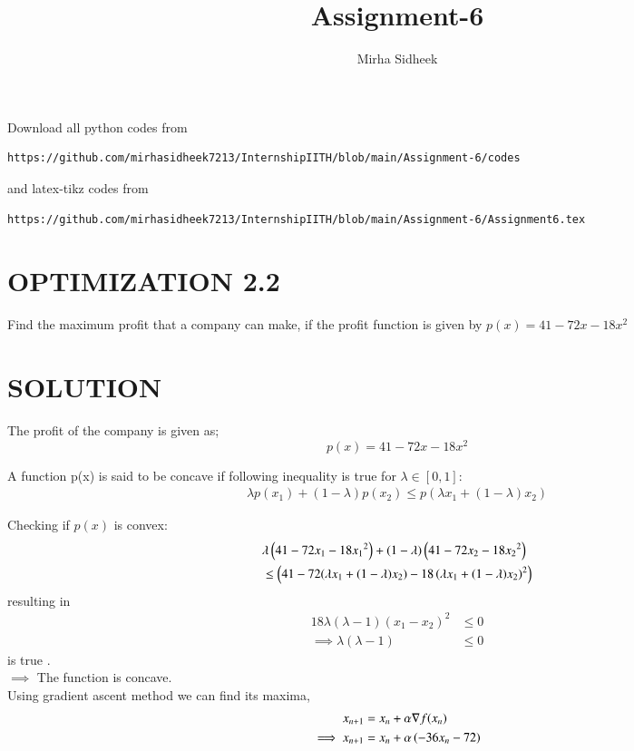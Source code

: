\documentclass[journal,12pt,twocolumn]{IEEEtran}
\begin{document}
     \def\rightbox#1{\makebox[0in][r]{#1}}
     \def\centbox#1{\makebox[0in]{#1}}
     \def\topbox#1{\raisebox{-\baselineskip}[0in][0in]{#1}}
     \def\midbox#1{\raisebox{-0.5\baselineskip}[0in][0in]{#1}}
\vspace{3cm}
\title{Assignment-6}
\author{Mirha Sidheek}
\maketitle
\newpage
\bigskip
\renewcommand{\thefigure}{\theenumi}
\renewcommand{\thetable}{\theenumi}
%
  Download all python codes from 
\begin{lstlisting}
https://github.com/mirhasidheek7213/InternshipIITH/blob/main/Assignment-6/codes
\end{lstlisting}
%
and latex-tikz codes from 
%
\begin{lstlisting}
https://github.com/mirhasidheek7213/InternshipIITH/blob/main/Assignment-6/Assignment6.tex
\end{lstlisting}
%
\section{OPTIMIZATION 2.2}
 Find the maximum profit that a company can
make, if the profit function is given by
$p(x)=41-72x-18x^2$
\section{SOLUTION}

The profit of the company is given as;
\begin{equation}
    p(x)=41-72x-18x^2
\end{equation}
\begin{lemma}
A function p(x) is said to be concave if following inequality is true for $\lambda \in [0,1] :$  \label{lemma1}
\begin{align}
    \lambda p(x_1) + (1-\lambda)p(x_2) \leq p(\lambda x_1 + (1-\lambda)x_2)
\end{align}
\end{lemma}
Checking if $p(x)$ is convex:
\begin{equation}
\begin{aligned}
    &\lambda\left(41-72{x_1}-18{x_1}^2\right) + 
    (1-\lambda)\left(41-72 {x_2}-18 {x_2}^2\right) \\ &\leq
    \left(41-72(\lambda x_1 + (1-\lambda)x_2)-18\left(\lambda x_1 + (1-\lambda)x_2\right)^2\right) 
\end{aligned}
\end{equation}
resulting in
\begin{align}
    18\lambda(\lambda - 1)({x_1} -{x_2})^2 &\leq 0\\
    \implies \lambda(\lambda - 1)&\leq 0
\end{align}is true .\\
$\implies$
The function is concave.\\
Using gradient ascent method we can find its maxima,
    \begin{align}
        x_{n+1} &= x_n + \alpha \nabla f(x_n) \\
        \implies x_{n+1} &= x_n + \alpha \left(-36x_n-72\right)
    \end{align}
    
\end{document}
